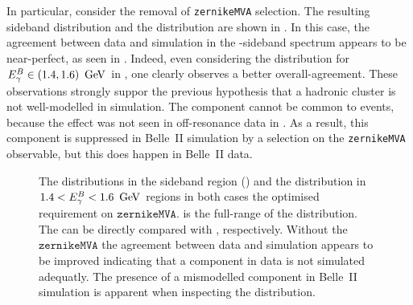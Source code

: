 In particular, consider the removal of \texttt{zernikeMVA} selection.
The resulting \EB sideband distribution and the \Mbc distribution are shown in .
In this case, the agreement between data and simulation in the \EB-sideband spectrum appears to be near-perfect, as seen in .
Indeed, even considering the \Mbc distribution for ${E^B_{\gamma}}\in(1.4,1.6)~\mathrm{\,Ge\kern -0.1em V}$ in , one clearly observes a better overall-agreement.
These observations strongly suppor the previous hypothesis that a hadronic cluster is not well-modelled in simulation.
The component cannot be common to \epem\ra\qqbar events, because the effect was not seen in off-resonance data in .
As a result, this component is suppressed in Belle~II simulation by a selection on the \texttt{zernikeMVA} observable, but this does happen in Belle~II data.
\begin{figure}[htbp!]
    \caption{\label{fig:nozmva_test}   The \EB distributions in the \EB sideband region ()
    and the \Mbc distribution in $1.4<{E^B_{\gamma}}<1.6~\mathrm{\,Ge\kern -0.1em V}$ regions in both cases the optimised requirement on $\mathtt{zernikeMVA}$.
     is the full-range of the \ZMVA distribution.
    The  can be directly compared with , respectively.
    Without the $\mathtt{zernikeMVA}$ the agreement between data and simulation appears to be improved indicating that a component in data is not simulated adequatly.
    The presence of a mismodelled component in Belle~II simulation is apparent when inspecting the \ZMVA distribution.
    }
\end{figure}


